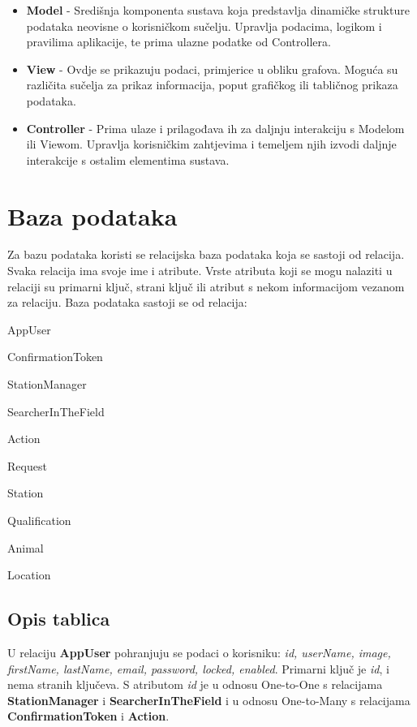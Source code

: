 	\begin{itemize}
		\item \textbf{Model} - Središnja komponenta sustava koja predstavlja dinamičke strukture podataka neovisne o korisničkom sučelju. Upravlja podacima, logikom i pravilima aplikacije, te prima ulazne podatke od Controllera.
		\item \textbf{View} - Ovdje se prikazuju podaci, primjerice u obliku grafova. Moguća su različita sučelja za prikaz informacija, poput grafičkog ili tabličnog prikaza podataka.
		\item \textbf{Controller} - Prima ulaze i prilagođava ih za daljnju interakciju s Modelom ili Viewom. Upravlja korisničkim zahtjevima i temeljem njih izvodi daljnje interakcije s ostalim elementima sustava.
	\end{itemize}
		

		

				
		\section{Baza podataka}
				
				Za bazu podataka koristi se relacijska baza podataka koja se sastoji od relacija. Svaka relacija ima svoje ime i atribute. Vrste atributa koji se mogu nalaziti u relaciji su primarni ključ, strani ključ ili atribut s nekom informacijom vezanom za relaciju. Baza podataka sastoji se od relacija:
		
				\begin{packed_item}
					\item AppUser
					\item ConfirmationToken
					\item StationManager
					\item SearcherInTheField
					\item Action
					\item Request
					\item Station
					\item Qualification
					\item Animal
					\item Location
				\end{packed_item}
		
			\subsection{Opis tablica}
			

				U relaciju \textbf{AppUser} pohranjuju se podaci o korisniku: \textit{id, userName, image, firstName, lastName, email, password, locked, enabled}. Primarni ključ je \textit{id}, i nema stranih ključeva. S atributom \textit{id} je u odnosu One-to-One s relacijama \textbf{StationManager} i \textbf{SearcherInTheField} i u odnosu One-to-Many s relacijama \textbf{ConfirmationToken} i \textbf{Action}.
				
